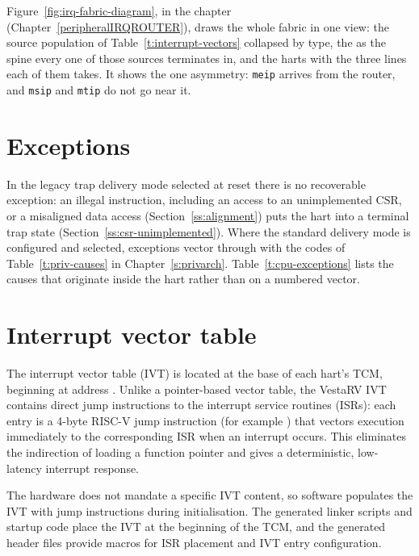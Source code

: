\documentclass[11pt,pdftex,openany,letterpaper]{report}
\begin{document}


Figure~\ref{fig:irq-fabric-diagram}, in the  chapter (Chapter~\ref{peripheralIRQROUTER}), draws the whole fabric in one view: the source population of Table~\ref{t:interrupt-vectors} collapsed by type, the  as the spine every one of those sources terminates in, and the \NumHartsWord{} harts with the three lines each of them takes. It shows the one asymmetry: \texttt{meip} arrives from the router, and \texttt{msip} and \texttt{mtip} do not go near it.

\section{Exceptions}

In the legacy trap delivery mode selected at reset there is no recoverable exception: an illegal instruction, including an access to an unimplemented CSR, or a misaligned data access (Section~\ref{ss:alignment}) puts the hart into a terminal trap state (Section~\ref{ss:csr-unimplemented}). Where the standard delivery mode is configured and selected, exceptions vector through  with the  codes of Table~\ref{t:priv-causes} in Chapter~\ref{s:privarch}. Table~\ref{t:cpu-exceptions} lists the causes that originate inside the hart rather than on a numbered vector.

\section{Interrupt vector table}

The interrupt vector table (IVT) is located at the base of each hart's TCM, beginning at address \texttt{\VectorsStartAddress}. Unlike a pointer-based vector table, the VestaRV IVT contains direct jump instructions to the interrupt service routines (ISRs): each entry is a 4-byte RISC-V jump instruction (for example ) that vectors execution immediately to the corresponding ISR when an interrupt occurs. This eliminates the indirection of loading a function pointer and gives a deterministic, low-latency interrupt response.

The hardware does not mandate a specific IVT content, so software populates the IVT with jump instructions during initialisation. The generated linker scripts and startup code place the IVT at the beginning of the TCM, and the generated header files provide macros for ISR placement and IVT entry configuration.
\end{document}
